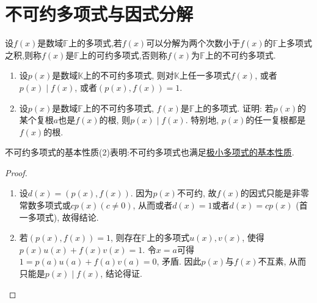 \documentclass[../../main.tex]{subfiles}
\begin{document}
\section{不可约多项式与因式分解}

\begin{definition}[不可约多项式的定义]\label{definition:不可约多项式的定义}
设\(f(x)\)是数域\(\mathbb{F}\)上的多项式,若\(f(x)\)可以分解为两个次数小于\(f(x)\)的\(\mathbb{F}\)上多项式之积,则称\(f(x)\)是\(\mathbb{F}\)上的可约多项式,否则称\(f(x)\)为\(\mathbb{F}\)上的不可约多项式.
\end{definition}

\begin{proposition}[不可约多项式的基本性质]\label{proposition:不可约多项式的基本性质}
\begin{enumerate}[(1)]
\item 设\(p(x)\)是数域\(\mathbb{K}\)上的不可约多项式, 则对\(\mathbb{K}\)上任一多项式\(f(x)\), 或者\(p(x)\mid f(x)\), 或者\((p(x),f(x)) = 1\).

\item 设\(p(x)\)是数域\(\mathbb{F}\)上的不可约多项式, \(f(x)\)是\(\mathbb{F}\)上的多项式. 证明: 若\(p(x)\)的某个复根\(a\)也是\(f(x)\)的根, 则\(p(x)\mid f(x)\). 特别地, \(p(x)\)的任一复根都是\(f(x)\)的根.
\end{enumerate}
\end{proposition}
\begin{note}
不可约多项式的基本性质(2)表明:不可约多项式也满足\hyperref[proposition:极小多项式的基本性质]{极小多项式的基本性质}.
\end{note}
\begin{proof}
\begin{enumerate}[(1)]
\item 设\(d(x)=(p(x),f(x))\). 因为\(p(x)\)不可约, 故\(f(x)\)的因式只能是非零常数多项式或\(cp(x)(c\neq 0)\), 从而或者\(d(x)=1\)或者\(d(x)=cp(x)\) (首一多项式), 故得结论.

\item 若\((p(x),f(x)) = 1\), 则存在\(\mathbb{F}\)上的多项式\(u(x),v(x)\), 使得\(p(x)u(x)+f(x)v(x)=1\). 令\(x = a\)可得\(1 = p(a)u(a)+f(a)v(a)=0\), 矛盾. 因此\(p(x)\)与\(f(x)\)不互素, 从而只能是\(p(x)\mid f(x)\), 结论得证. 
\end{enumerate}

\end{proof}
\end{document}
